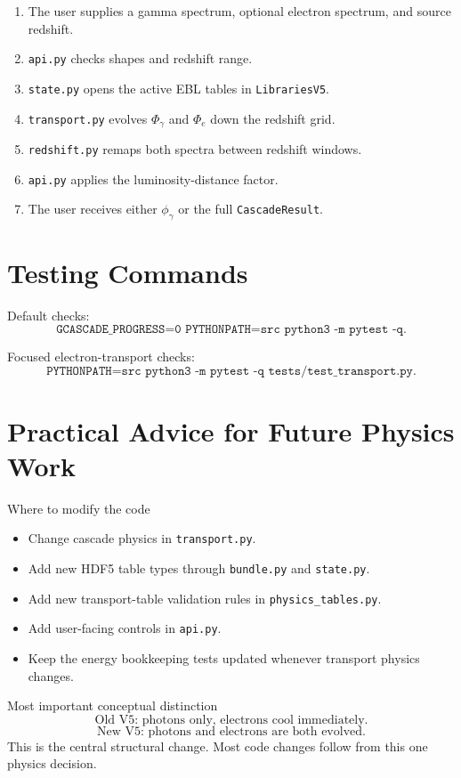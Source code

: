 \documentclass[11pt]{article}
\newcommand{\code}[1]{\texttt{#1}}
\begin{document}
\begin{enumerate}
  \item The user supplies a gamma spectrum, optional electron spectrum, and source redshift.
  \item \code{api.py} checks shapes and redshift range.
  \item \code{state.py} opens the active EBL tables in \code{LibrariesV5}.
  \item \code{transport.py} evolves $\Phi_\gamma$ and $\Phi_e$ down the redshift grid.
  \item \code{redshift.py} remaps both spectra between redshift windows.
  \item \code{api.py} applies the luminosity-distance factor.
  \item The user receives either $\phi_\gamma$ or the full \code{CascadeResult}.
\end{enumerate}

\section{Testing Commands}

Default checks:
\[
  \code{GCASCADE\_PROGRESS=0\ PYTHONPATH=src\ python3\ -m\ pytest\ -q}.
\]

Focused electron-transport checks:
\[
  \code{PYTHONPATH=src\ python3\ -m\ pytest\ -q\ tests/test\_transport.py}.
\]

\section{Practical Advice for Future Physics Work}

\begin{guidebox}{Where to modify the code}
\begin{itemize}
  \item Change cascade physics in \code{transport.py}.
  \item Add new HDF5 table types through \code{bundle.py} and \code{state.py}.
  \item Add new transport-table validation rules in \code{physics\_tables.py}.
  \item Add user-facing controls in \code{api.py}.
  \item Keep the energy bookkeeping tests updated whenever transport physics changes.
\end{itemize}
\end{guidebox}

\begin{warnbox}{Most important conceptual distinction}
\[
  \text{Old V5: photons only, electrons cool immediately.}
\]
\[
  \text{New V5: photons and electrons are both evolved.}
\]
This is the central structural change. Most code changes follow from this one
physics decision.
\end{warnbox}
\end{document}
